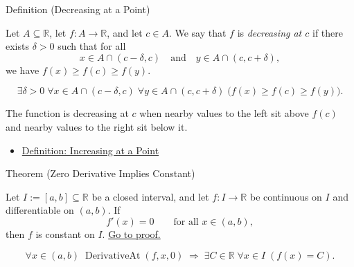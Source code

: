 
\begin{definitionbox}{Definition (Decreasing at a Point)}
\begin{definition}
\label{def:decreasing-at-a-point}
Let $A \subseteq \mathbb{R}$, let $f : A \to \mathbb{R}$, and let $c \in A$. We say that $f$ is \emph{decreasing at $c$} if there exists $\delta > 0$ such that for all
\[
x \in A \cap (c-\delta,c)
\quad \text{and} \quad
y \in A \cap (c,c+\delta),
\]
we have $f(x) \geq f(c) \geq f(y)$.
\end{definition}
\end{definitionbox}

\begin{remark*}
\[
\exists \delta > 0\;\forall x \in A \cap (c-\delta,c)\;\forall y \in A \cap (c,c+\delta)
\;\bigl(f(x) \geq f(c) \geq f(y)\bigr).
\]
\end{remark*}

\begin{remark*}[Interpretation]
The function is decreasing at $c$ when nearby values to the left sit above $f(c)$ and nearby values to the right sit below it.
\end{remark*}

\begin{dependencies}
\begin{itemize}
  \item \hyperref[def:increasing-at-a-point]{Definition: Increasing at a Point}
\end{itemize}
\end{dependencies}


\begin{theorembox}{Theorem (Zero Derivative Implies Constant)}
\begin{theorem}
\label{thm:zero-derivative-implies-constant}
Let $I := [a,b] \subseteq \mathbb{R}$ be a closed interval, and let $f : I \to \mathbb{R}$ be continuous on $I$ and differentiable on $(a,b)$. If
\[
f'(x) = 0 \qquad \text{for all } x \in (a,b),
\]
then $f$ is constant on $I$.
\hyperref[prf:zero-derivative-implies-constant]{Go to proof.}
\end{theorem}
\end{theorembox}

\begin{remark*}
\[
\forall x \in (a,b)\;\operatorname{DerivativeAt}(f,x,0)
\;\Rightarrow\;
\exists C \in \mathbb{R}\;\forall x \in I\;(f(x) = C).
\]
\end{remark*}

